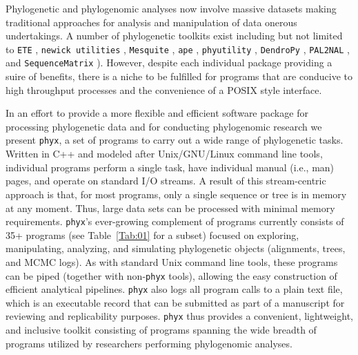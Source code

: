 \documentclass{bioinfo}
\begin{document}
Phylogenetic and phylogenomic analyses now involve massive datasets making traditional approaches for analysis and manipulation of data onerous undertakings. A number of
phylogenetic toolkits exist including but not limited to \texttt{ETE} \citep{HuertaCepas2016}, \texttt{newick utilities} \citep{JunierZdobnov2010}, \texttt{Mesquite}
\citep{MaddisonMaddison2016}, \texttt{ape} \citep{Popescu2012},
\texttt{phyutility} \citep{SmithDunn2008}, \texttt{DendroPy}
\citep{SukumaranHolder2010}, \texttt{PAL2NAL} \citep{Suyama2006}, and
\texttt{SequenceMatrix} \citep{Vaidya2011}). However, despite each
individual package providing a suire of benefits, there is a niche
to be fulfilled for programs that are conducive to high throughput
processes and the convenience of a POSIX style interface.

In an effort to provide a more flexible and efficient software package for processing phylogenetic data and for conducting phylogenomic research we present \texttt{phyx}, a set of programs to carry
out a wide range of phylogenetic tasks. Written in C++ and modeled after
Unix/GNU/Linux command line tools, individual programs perform a single task,
have individual manual (i.e., man) pages, and operate on standard I/O streams. A result of
this stream-centric approach is that, for most programs, only a single sequence
or tree is in memory at any moment. Thus, large data sets can be
processed with minimal memory requirements. \texttt{phyx}'s
ever-growing complement of programs currently consists of 35+ programs
(see Table~\ref{Tab:01} for a subset) focused on exploring, manipulating, analyzing,
and simulating phylogenetic objects (alignments, trees, and MCMC logs).
As with standard Unix command line tools, these programs can be piped
(together with non-\texttt{phyx} tools), allowing the easy construction
of efficient analytical pipelines. \texttt{phyx} also logs all program calls
to a plain text file, which is an executable record that can be submitted as
part of a manuscript for reviewing and replicability purposes. 
\texttt{phyx} thus provides a convenient, lightweight, and inclusive toolkit consisting of programs spanning the wide breadth of programs utilized by researchers performing phylogenomic analyses. 
\end{document}
